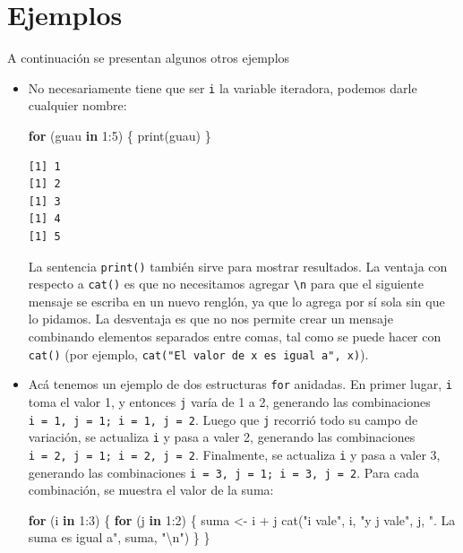 \documentclass[
]{book}
\newenvironment{Shaded}{\begin{snugshade}}{\end{snugshade}}
\newcommand{\ControlFlowTok}[1]{\textcolor[rgb]{0.13,0.29,0.53}{\textbf{#1}}}
\newcommand{\DecValTok}[1]{\textcolor[rgb]{0.00,0.00,0.81}{#1}}
\newcommand{\FunctionTok}[1]{\textcolor[rgb]{0.00,0.00,0.00}{#1}}
\newcommand{\NormalTok}[1]{#1}
\newcommand{\OtherTok}[1]{\textcolor[rgb]{0.56,0.35,0.01}{#1}}
\newcommand{\SpecialCharTok}[1]{\textcolor[rgb]{0.00,0.00,0.00}{#1}}
\newcommand{\StringTok}[1]{\textcolor[rgb]{0.31,0.60,0.02}{#1}}
\begin{document}
\hypertarget{ejemplos}{%
\section{Ejemplos}\label{ejemplos}}

A continuación se presentan algunos otros ejemplos

\begin{itemize}
\item
  No necesariamente tiene que ser \texttt{i} la variable iteradora, podemos darle cualquier nombre:

\begin{Shaded}
\begin{Highlighting}[]
\ControlFlowTok{for}\NormalTok{ (guau }\ControlFlowTok{in} \DecValTok{1}\SpecialCharTok{:}\DecValTok{5}\NormalTok{) \{}
    \FunctionTok{print}\NormalTok{(guau)}
\NormalTok{\}}
\end{Highlighting}
\end{Shaded}

\begin{verbatim}
[1] 1
[1] 2
[1] 3
[1] 4
[1] 5
\end{verbatim}

  La sentencia \texttt{print()} también sirve para mostrar resultados. La ventaja con respecto a \texttt{cat()} es que no necesitamos agregar \texttt{\textbackslash{}n} para que el siguiente mensaje se escriba en un nuevo renglón, ya que lo agrega por sí sola sin que lo pidamos. La desventaja es que no nos permite crear un mensaje combinando elementos separados entre comas, tal como se puede hacer con \texttt{cat()} (por ejemplo, \texttt{cat("El\ valor\ de\ x\ es\ igual\ a",\ x)}).
\item
  Acá tenemos un ejemplo de dos estructuras \texttt{for} anidadas. En primer lugar, \texttt{i} toma el valor 1, y entonces \texttt{j} varía de 1 a 2, generando las combinaciones \texttt{i\ =\ 1,\ j\ =\ 1;\ i\ =\ 1,\ j\ =\ 2}. Luego que \texttt{j} recorrió todo su campo de variación, se actualiza \texttt{i} y pasa a valer 2, generando las combinaciones \texttt{i\ =\ 2,\ j\ =\ 1;\ i\ =\ 2,\ j\ =\ 2}. Finalmente, se actualiza \texttt{i} y pasa a valer 3, generando las combinaciones \texttt{i\ =\ 3,\ j\ =\ 1;\ i\ =\ 3,\ j\ =\ 2}. Para cada combinación, se muestra el valor de la suma:

\begin{Shaded}
\begin{Highlighting}[]
\ControlFlowTok{for}\NormalTok{ (i }\ControlFlowTok{in} \DecValTok{1}\SpecialCharTok{:}\DecValTok{3}\NormalTok{) \{}
    \ControlFlowTok{for}\NormalTok{ (j }\ControlFlowTok{in} \DecValTok{1}\SpecialCharTok{:}\DecValTok{2}\NormalTok{) \{}
\NormalTok{        suma }\OtherTok{\textless{}{-}}\NormalTok{ i }\SpecialCharTok{+}\NormalTok{ j}
        \FunctionTok{cat}\NormalTok{(}\StringTok{"i vale"}\NormalTok{, i, }\StringTok{"y j vale"}\NormalTok{, j, }\StringTok{". La suma es igual a"}\NormalTok{, suma, }\StringTok{"}\SpecialCharTok{\textbackslash{}n}\StringTok{"}\NormalTok{) }
\NormalTok{    \}}
\NormalTok{\}}
\end{Highlighting}
\end{Shaded}


\end{itemize}
\end{document}
